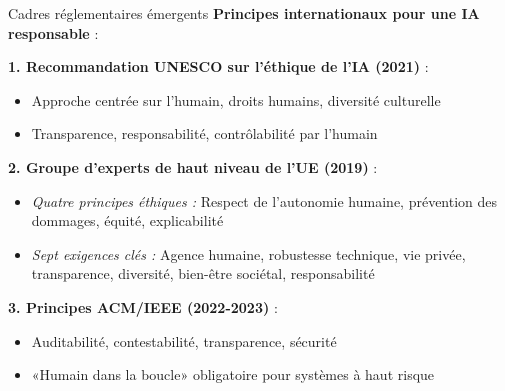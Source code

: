 \documentclass[9pt, aspectratio=169]{beamer}
\begin{document}
\begin{frame}{Cadres réglementaires émergents}
    \textbf{Principes internationaux pour une IA responsable} :
    
    \vspace{0.3cm}
    \textbf{1. Recommandation UNESCO sur l'éthique de l'IA (2021)} :
    \begin{itemize}
        \item Approche centrée sur l'humain, droits humains, diversité culturelle
        \item Transparence, responsabilité, contrôlabilité par l'humain
    \end{itemize}
    
    \textbf{2. Groupe d'experts de haut niveau de l'UE (2019)} :
    \begin{itemize}
        \item \textit{Quatre principes éthiques :} Respect de l'autonomie humaine, prévention des dommages, équité, explicabilité
        \item \textit{Sept exigences clés :} Agence humaine, robustesse technique, vie privée, transparence, diversité, bien-être sociétal, responsabilité
    \end{itemize}
    
    \textbf{3. Principes ACM/IEEE (2022-2023)} :
    \begin{itemize}
        \item Auditabilité, contestabilité, transparence, sécurité
        \item «Humain dans la boucle» obligatoire pour systèmes à haut risque
    \end{itemize}
\end{frame}
\end{document}

